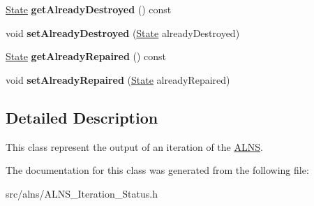 \begin{DoxyCompactItemize}
\item 
\hypertarget{classALNS__Iteration__Status_a6683f3e5c476a9387eebd3db2c455e36}{\hyperlink{classALNS__Iteration__Status_a6d748b05080edeab9e82ac32c9904133}{State} {\bfseries get\-Already\-Destroyed} () const }\label{classALNS__Iteration__Status_a6683f3e5c476a9387eebd3db2c455e36}

\item 
\hypertarget{classALNS__Iteration__Status_aa3ea7c59a5c55fd4ec32516e3c4d9d2e}{void {\bfseries set\-Already\-Destroyed} (\hyperlink{classALNS__Iteration__Status_a6d748b05080edeab9e82ac32c9904133}{State} already\-Destroyed)}\label{classALNS__Iteration__Status_aa3ea7c59a5c55fd4ec32516e3c4d9d2e}

\item 
\hypertarget{classALNS__Iteration__Status_a400f479c974f6279124033504b327386}{\hyperlink{classALNS__Iteration__Status_a6d748b05080edeab9e82ac32c9904133}{State} {\bfseries get\-Already\-Repaired} () const }\label{classALNS__Iteration__Status_a400f479c974f6279124033504b327386}

\item 
\hypertarget{classALNS__Iteration__Status_abc814ed1e79192b0454a20fe9c2175cb}{void {\bfseries set\-Already\-Repaired} (\hyperlink{classALNS__Iteration__Status_a6d748b05080edeab9e82ac32c9904133}{State} already\-Repaired)}\label{classALNS__Iteration__Status_abc814ed1e79192b0454a20fe9c2175cb}

\end{DoxyCompactItemize}


\subsection{Detailed Description}
This class represent the output of an iteration of the \hyperlink{classALNS}{A\-L\-N\-S}. 

The documentation for this class was generated from the following file\-:\begin{DoxyCompactItemize}
\item 
src/alns/A\-L\-N\-S\-\_\-\-Iteration\-\_\-\-Status.\-h\end{DoxyCompactItemize}
